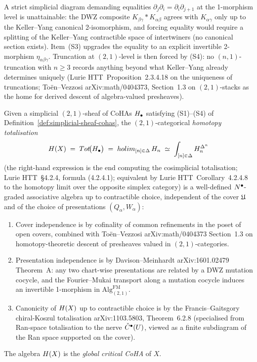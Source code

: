 \begin{remark}
\label{rem:strictness-fails}
A strict simplicial diagram demanding equalities
$\partial_j \partial_i = \partial_i \partial_{j+1}$ at the
1-morphism level is unattainable: the DWZ composite
$K_{\beta\gamma} \ast K_{\alpha\beta}$ agrees with $K_{\alpha\gamma}$
only up to the Keller--Yang canonical 2-isomorphism, and forcing
equality would require a splitting of the Keller--Yang contractible
space of intertwiners (no canonical section exists). Item~(S3)
upgrades the equality to an explicit invertible 2-morphism
$\eta_{\alpha\beta\gamma}$. Truncation at $(2,1)$-level is then
forced by (S4): no $(n,1)$-truncation with $n \geq 3$ records
anything beyond what Keller--Yang already determines uniquely
(Lurie HTT~Proposition~2.3.4.18 on the uniqueness of truncations;
Toën--Vezzosi arXiv:math/0404373, Section~1.3 on $(2,1)$-stacks as
the home for derived descent of algebra-valued presheaves).
\end{remark}

\begin{proposition}
\label{prop:descent-reduction}
\ClaimStatusProposition
Given a simplicial $(2,1)$-sheaf of CoHAs $H_\bullet$ satisfying
(S1)--(S4) of Definition~\ref{def:simplicial-sheaf-cohas}, the
$(2,1)$-categorical \emph{homotopy totalisation}
\[
  H(X) \;=\; Tot\!\bigl(H_\bullet\bigr)
  \;=\;
  holim_{[n] \in \Delta}\, H_n
  \;\simeq\;
  \int_{[n] \in \Delta} H_n^{\Delta^n}
\]
(the right-hand expression is the end computing the cosimplicial
totalisation; Lurie HTT~\S4.2.4, formula (4.2.4.1); equivalent by
Lurie HTT~Corollary~4.2.4.8 to the homotopy limit over the
opposite simplex category) is a well-defined
$N^\bullet$-graded associative algebra up to contractible choice,
independent of the cover $\mathfrak{U}$ and of the choice of
presentations $(Q_\alpha, W_\alpha)$:
\begin{enumerate}
\item Cover independence is by cofinality of common refinements in
  the poset of open covers, combined with Toën--Vezzosi
  arXiv:math/0404373 Section~1.3 on homotopy-theoretic descent of
  presheaves valued in $(2,1)$-categories.
\item Presentation independence is by Davison--Meinhardt
  arXiv:1601.02479 Theorem~A: any two chart-wise presentations are
  related by a DWZ mutation cocycle, and the Fourier--Mukai
  transport along a mutation cocycle induces an invertible
  1-morphism in $\mathrm{Alg}^{\mathrm{FM}}_{(2,1)}$.
\item Canonicity of $H(X)$ up to contractible choice is by the
  Francis--Gaitsgory chiral-Koszul totalisation arXiv:1103.5803,
  Theorem~6.2.8 (specialised from Ran-space totalisation to the
  nerve $\check{C}^\bullet(U)$, viewed as a finite
  subdiagram of the Ran space supported on the cover).
\end{enumerate}
The algebra $H(X)$ is the \emph{global critical CoHA} of $X$.
\end{proposition}

